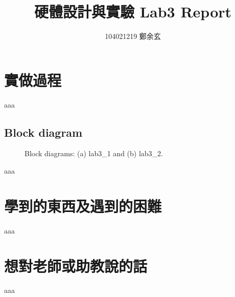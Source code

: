 \documentclass{article}
\begin{document}
\begin{CJK}{UTF8}{bsmi}
\title{硬體設計與實驗 Lab3 Report}
\author{104021219 鄭余玄}
\date{}
\maketitle
\section{實做過程}
aaa

\subsection{Block diagram}
\begin{figure*}[]
\caption{Block diagrams: (a) lab3\_1 and (b) lab3\_2.}
\end{figure*}
aaa

\section{學到的東西及遇到的困難}
aaa

\section{想對老師或助教說的話}
aaa

\end{CJK}
\end{document}
